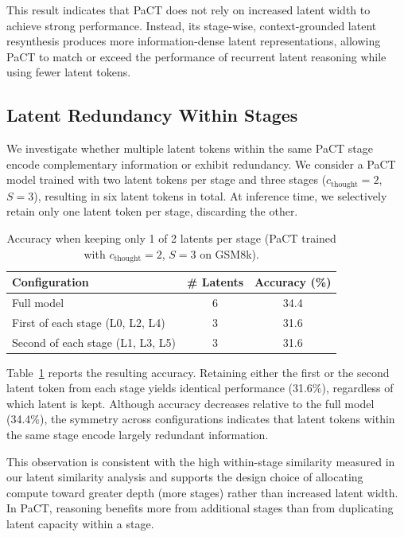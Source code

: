 This result indicates that PaCT does not rely on increased latent width to achieve strong performance. Instead, its stage-wise, context-grounded latent resynthesis produces more information-dense latent representations, allowing PaCT to match or exceed the performance of recurrent latent reasoning while using fewer latent tokens.

\subsection{Latent Redundancy Within Stages}
\label{subsec:latent_redundancy}
We investigate whether multiple latent tokens within the same PaCT stage encode complementary information or exhibit redundancy. We consider a PaCT model trained with two latent tokens per stage and three stages ($c_{\text{thought}}=2$, $S=3$), resulting in six latent tokens in total. At inference time, we selectively retain only one latent token per stage, discarding the other.
\begin{table}[h]
    \centering
    \small
    \caption{Accuracy when keeping only 1 of 2 latents per stage (PaCT trained with $c_{\text{thought}}=2$, $S=3$ on GSM8k).}
    \label{tab:latent_redundancy}
    \begin{tabular}{lcc}
        \toprule
        Configuration & \# Latents & Accuracy (\%) \\
        \midrule
        Full model & 6 & 34.4 \\
        First of each stage (L0, L2, L4) & 3 & 31.6 \\
        Second of each stage (L1, L3, L5) & 3 & 31.6 \\
        \bottomrule
    \end{tabular}
\end{table}

Table~\ref{tab:latent_redundancy} reports the resulting accuracy. Retaining either the first or the second latent token from each stage yields identical performance (31.6\%), regardless of which latent is kept. Although accuracy decreases relative to the full model (34.4\%), the symmetry across configurations indicates that latent tokens within the same stage encode largely redundant information.

This observation is consistent with the high within-stage similarity measured in our latent similarity analysis and supports the design choice of allocating compute toward greater depth (more stages) rather than increased latent width. In PaCT, reasoning benefits more from additional stages than from duplicating latent capacity within a stage.


